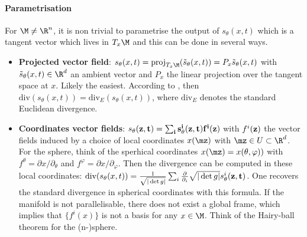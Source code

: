 \paragraph{Parametrisation}
For $\M \neq \R^n$, it is non trivial to parametrise the output of $s_\theta(x, t)$ which is a tangent vector which lives in $T_{x}\M$ and this can be done in several ways.
%
\begin{itemize}
    \item \textbf{Projected vector field}: $s_\theta(x, t) = \text{proj}_{T_{x}\M}(\tilde{s}_\theta(x, t)) = P_x \tilde{s}_\theta(x, t) $ with $\tilde{s}_\theta(x, t) \in \R^d$ an ambient vector and $P_x$ the linear projection over the tangent space at $x$. Likely the easiest.
    According to \cite{rozen2021moser}, then $\text{div}(s_\theta(x, t)) = \text{div}_E(s_\theta(x, t))$, where $\text{div}_E$ denotes the standard Euclidean divergence.
    
    \item \textbf{Coordinates vector fields}: $s_\theta(\bf{z}, t) = \sum_i s^i_\theta(\bf{z}, t) f^i(\bf{z})$ with $f^i(\bf{z})$ the vector fields induced by a choice of local coordinates $x(\mz)$ with $\mz \in U \subset \R^d$. For the sphere, think of the sperhical coordinates $x(\mz)=x(\theta, \varphi))$ with $f^\theta = \partial x/ \partial_\theta$ and $f^\varphi = \partial x/ \partial_\varphi$.
    Then the divergence can be computed in these local coordinates: $\text{div}(s_\theta(x, t)) = \frac{1}{\sqrt{|\det g|}} \sum_i \frac{\partial}{\partial_i} \sqrt{|\det g|} s^i_\theta(\bf{z}, t)$. One recovers the standard divergence in spherical coordinates with this formula.
    If the manifold is not parallelisable, there does not exist a global frame, which implies that $\{f^i(x)\}$ is not a basis for any $x \in \M$. Think of the Hairy-ball theorem for the (n-)sphere.
    

\end{itemize}
